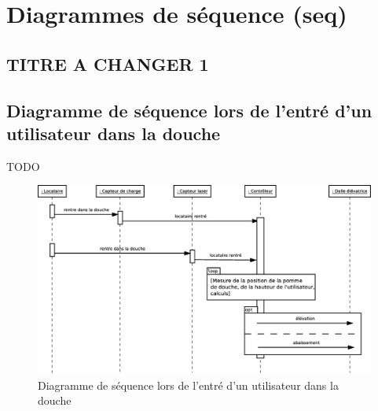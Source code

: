 \chapter{Diagrammes de séquence (seq)}
\section{TITRE A CHANGER 1}

\section{Diagramme de séquence lors de l'entré d'un utilisateur dans la douche}
TODO
\begin{figure}[H]
	\centering
	\includegraphics[width=1\linewidth]{diagrams/bathroom/diagramme_sequence2.eps}
	\caption{Diagramme de séquence lors de l'entré d'un utilisateur dans la douche}
	\label{fig:diagramme_seq2}
\end{figure}
